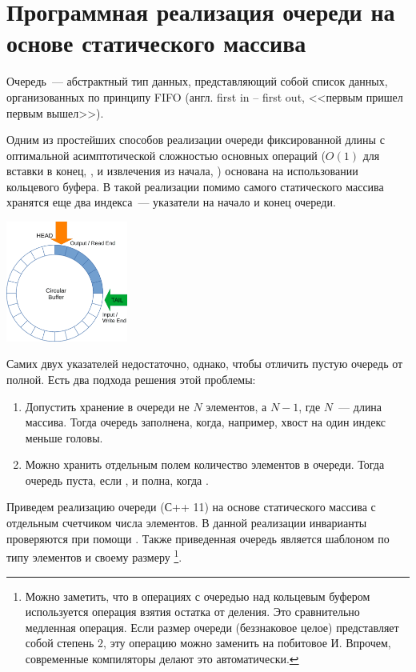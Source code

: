 %
%

\section{Программная реализация очереди на основе статического массива}
Очередь~--- абстрактный тип данных, представляющий собой список данных, организованных по принципу FIFO (англ. first in -- first out,
<<первым пришел первым вышел>>).

Одним из простейших способов реализации очереди фиксированной длины с оптимальной асимптотической сложностью основных операций (\(O(1)\) для вставки в конец, , и
извлечения из начала, ) основана на использовании кольцевого буфера. В такой реализации помимо самого статического массива
хранятся еще два индекса~--- указатели на начало и конец очереди.

\begin{center}
  \includegraphics[width=0.3\textwidth]{resources/19-26/ring.png}
\end{center}

Самих двух указателей недостаточно, однако, чтобы отличить пустую очередь от полной. Есть два подхода решения этой проблемы:
\begin{enumerate}
  \item Допустить хранение в очереди не \(N\) элементов, а \(N - 1\), где \(N\)~--- длина массива. Тогда
        очередь заполнена, когда, например, хвост на один индекс меньше головы.
  \item Можно хранить отдельным полем количество элементов в очереди. Тогда очередь пуста, если , и полна, когда
        .
\end{enumerate}

Приведем реализацию очереди (С++ 11) на основе статического массива с отдельным счетчиком числа элементов. В данной реализации инварианты проверяются при
помощи . Также приведенная очередь является шаблоном по типу элементов и своему размеру
\footnote{Можно заметить, что в операциях с очередью над кольцевым буфером используется операция взятия остатка от деления. Это сравнительно
  медленная операция. Если размер очереди (беззнаковое целое) представляет собой степень \(2\), эту операцию можно заменить на побитовое И. Впрочем, современные
  компиляторы делают это автоматически.}.

